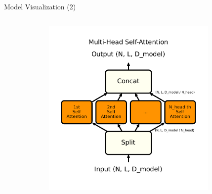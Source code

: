 \documentclass[10pt]{beamer}
\begin{document}
\begin{frame}[fragile]{Model Visualization (2)}
\begin{columns}
\begin{column}{0.3\textwidth}
\begin{figure}
\end{figure}    
\end{column}
\begin{column}{0.3\textwidth}
\begin{figure}
    \centering
    \includegraphics[width=\textwidth]{figures/model/multi-head-self-attention.pdf}
\end{figure}    
\end{column}
\begin{column}{0.3\textwidth}
\begin{figure}
    \centering

\end{figure}
\end{column}
\end{columns}
\end{frame}
\end{document}
